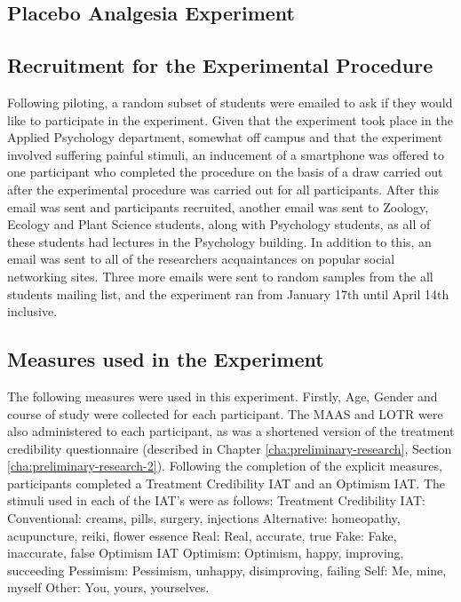 \subsection{Placebo Analgesia Experiment}

\subsection{Recruitment for the Experimental Procedure}

Following piloting, a random subset of students were emailed to ask if they would like to participate in the experiment. Given that the experiment took place in the Applied Psychology department, somewhat off campus and that the experiment involved suffering painful stimuli, an inducement of a smartphone was offered to one participant who completed the procedure on the basis of a draw carried out after the experimental procedure was carried out for all participants.  After this email was sent and participants recruited, another email was sent to Zoology, Ecology and Plant Science students, along with Psychology students, as all of these students had lectures in the Psychology building. In addition to this, an email was sent to all of the researchers acquaintances on popular social networking sites. Three more emails were sent to random samples from the all students mailing list, and the experiment ran from January 17th until April 14th inclusive.

\subsection{Measures used in the Experiment}
\label{sec:meas-used-exper}

The following measures were used in this experiment. Firstly, Age, Gender and course of study were collected for each participant. The MAAS and LOTR were also administered to each participant, as was a shortened version of the treatment credibility questionnaire (described in Chapter \ref{cha:preliminary-research}, Section \ref{cha:preliminary-research-2}). Following the completion of the explicit measures, participants completed a Treatment Credibility IAT and an Optimism IAT. The stimuli used in each of the IAT's were as follows:
\textup{Treatment Credibility IAT:}
Conventional: creams, pills, surgery, injections
Alternative: homeopathy, acupuncture, reiki, flower essence
Real: Real, accurate, true
Fake: Fake, inaccurate, false
Optimism IAT
Optimism: Optimism, happy, improving, succeeding
Pessimism: Pessimism, unhappy, disimproving, failing
Self: Me, mine, myself
Other: You, yours, yourselves. 

